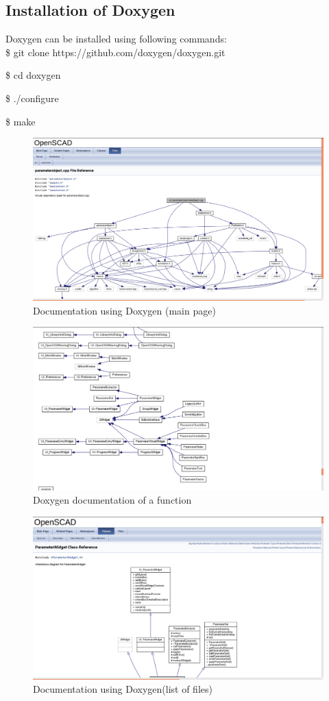 \subsection{Installation of Doxygen}
Doxygen can be installed using following commands:\\

\hspace{4pt} \$ git clone https://github.com/doxygen/doxygen.git

\hspace{4pt} \$ cd doxygen

\hspace{4pt} \$ ./configure

\hspace{4pt} \$ make

\begin{figure}[H]
\centering \includegraphics[scale=.35]{images/doc.png}
\caption{Documentation using Doxygen (main page)}
\end{figure}


\begin{figure}[H]
\centering \includegraphics[scale=.35]{images/doc1.png}
\caption{Doxygen documentation of a function}
\end{figure}
\begin{figure}[H]
\centering \includegraphics[scale=.35]{images/doc2.png}
\caption{Documentation using Doxygen(list of files)}
\end{figure}


